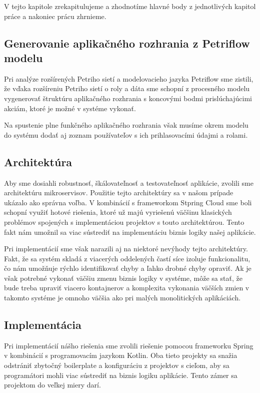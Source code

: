 V tejto kapitole zrekapitulujeme a zhodnotíme hlavné body z jednotlivých kapitol práce  a nakoniec prácu zhrnieme. 

\subsection{Generovanie aplikačného rozhrania z Petriflow modelu}
Pri analýze rozšírených Petriho sietí a modelovacieho jazyka Petriflow sme zistili, že vďaka rozšíreniu Petriho sietí o roly a dáta sme schopní z procesného modelu vygenerovať štruktúru aplikačného rozhrania s koncovými bodmi prislúchajúcimi akciám, ktoré je možné v systéme vykonať.

Na spustenie plne funkčného aplikačného rozhrania však musíme okrem modelu do systému dodať aj zoznam používateľov s ich prihlasovacími údajmi a rolami.

\subsection{Architektúra}
Aby sme dosiahli robustnosť, škálovateľnosť a testovateľnosť aplikácie, zvolili sme architektúru mikroservisov. Použitie tejto architektúry sa v našom prípade ukázalo ako správna voľba. V kombinácií s frameworkom Stpring Cloud sme boli schopní využiť hotové riešenia, ktoré už majú vyriešenú väčšinu klasických problémov spojených s implementáciou projektov s touto architektúrou. Tento fakt nám umožnil sa viac sústrediť na implementáciu biznis logiky našej aplikácie.

Pri implementácií sme však narazili aj na niektoré nevýhody tejto architektúry. Fakt, že sa systém skladá z viacerých oddelených častí síce izoluje funkcionalitu, čo nám umožňuje rýchlo identifikovať chyby a ľahko drobné chyby opraviť. Ak je však potrebné vykonať väčšiu zmenu biznis logiky v systéme, môže sa stať, že bude treba upraviť viacero kontajnerov a komplexita vykonania väčších zmien v takomto systéme je omnoho väčšia ako pri malých monolitických aplikáciách.

\subsection{Implementácia}
Pri implementácií nášho riešenia sme zvolili riešenie pomocou frameworku Spring v kombinácií s programovacím jazykom Kotlin. Oba tieto projekty sa snažia odstrániť zbytočný boilerplate a konfiguráciu z projektov s cieľom, aby sa programátori mohli viac sústrediť na biznis logiku aplikácie. Tento zámer sa projektom do veľkej miery darí. 

